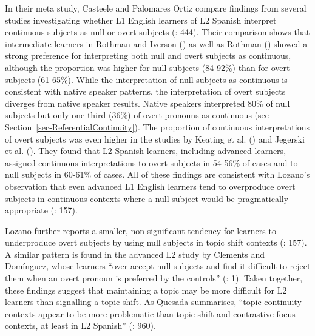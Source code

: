 \documentclass[
  letterpaper,
  DIV=11,
  numbers=noendperiod]{scrartcl}
\begin{document}
In their meta study, Casteele and Palomares Ortiz compare findings from
several studies investigating whether L1 English learners of L2 Spanish
interpret continuous subjects as null or overt subjects
(: 444). Their comparison
shows that intermediate learners in Rothman and Iverson
() as well as Rothman
() showed a strong preference
for interpreting both null and overt subjects as continuous, although
the proportion was higher for null subjects (84-92\%) than for overt
subjects (61-65\%). While the interpretation of null subjects as
continuous is consistent with native speaker patterns, the
interpretation of overt subjects diverges from native speaker results.
Native speakers interpreted 80\% of null subjects but only one third
(36\%) of overt pronouns as continuous (see
Section~\ref{sec-ReferentialContinuity}). The proportion of continuous
interpretations of overt subjects was even higher in the studies by
Keating et al. () and Jegerski et al.
(). They found that L2 Spanish
learners, including advanced learners, assigned continuous
interpretations to overt subjects in 54-56\% of cases and to null
subjects in 60-61\% of cases. All of these findings are consistent with
Lozano's observation that even advanced L1 English learners tend to
overproduce overt subjects in continuous contexts where a null subject
would be pragmatically appropriate (: 157).

Lozano further reports a smaller, non-significant tendency for learners
to underproduce overt subjects by using null subjects in topic shift
contexts (: 157). A similar
pattern is found in the advanced L2 study by Clements and Domínguez,
whose learners ``over-accept null subjects and find it difficult to
reject them when an overt pronoun is preferred by the controls''
(: 1). Taken together,
these findings suggest that maintaining a topic may be more difficult
for L2 learners than signalling a topic shift. As Quesada summarises,
``topic-continuity contexts appear to be more problematic than topic
shift and contrastive focus contexts, at least in L2 Spanish''
(: 960).
\end{document}
